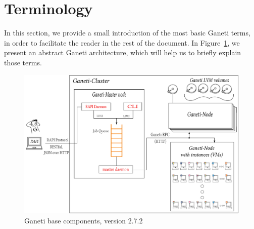 \section{Terminology}

In this section, we provide a small introduction of the most basic Ganeti terms,
in order to facilitate the reader in the rest of the document. In
Figure~\ref{fig:gnt_abst}, we present an abstract Ganeti architecture, which will
help us to briefly explain those terms.

\begin{figure}[htbp]
  \begin{center}
    \includegraphics[width=1.0\maxwidth]{../figures/ganeti_abst_arch.pdf}
    \caption{Ganeti base components, version 2.7.2\label{fig:gnt_abst}}
   \end{center}
\end{figure}

